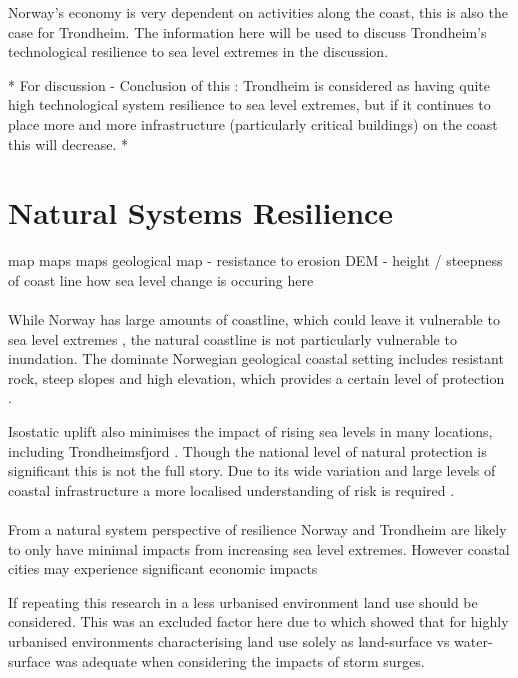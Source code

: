 Norway's economy is very dependent on activities along the coast\cite{aunan_strong_2008}, this is also the case for Trondheim. The information here will be used to discuss Trondheim's technological resilience to sea level extremes in the discussion. 


* For discussion - Conclusion of this : Trondheim is considered as having quite high technological system resilience to sea level extremes, but if it continues to place more and more infrastructure (particularly critical buildings) on the coast this will decrease. *

\section{Natural Systems Resilience}
map maps maps
geological map - resistance to erosion
DEM - height / steepness of coast line
how sea level change is occuring here
\paragraph{}
While Norway has large amounts of coastline, which could leave it vulnerable to sea level extremes \cite{aunan_strong_2008}, the natural coastline is not particularly vulnerable to inundation. The dominate Norwegian geological coastal setting includes resistant rock, steep slopes and high elevation, which provides a certain level of protection \cite{aunan_strong_2008}. 

Isostatic uplift also minimises the impact of rising sea levels in many locations, including Trondheimsfjord \cite{aunan_strong_2008}. Though the national level of natural protection is significant this is not the full story. Due to its wide variation and large levels of coastal infrastructure a more localised understanding of risk is required \cite{rod_integrated_2012}. 
\paragraph{}






From a natural system perspective of resilience Norway and Trondheim are likely to only have minimal impacts from increasing sea level extremes. However coastal cities may experience significant economic impacts \cite{aunan_strong_2008}

If repeating this research in a less urbanised environment land use should be considered. This was an excluded factor here due to \cite{hoffken_effects_2020} which showed that for highly urbanised environments characterising land use solely as land-surface vs water-surface was adequate when considering the impacts of storm surges.

